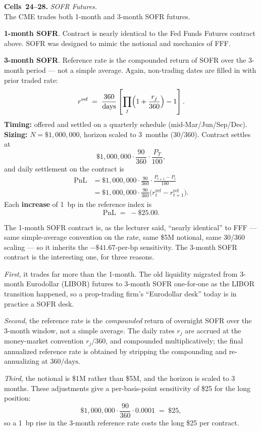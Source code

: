 \begin{keyblock}
\textbf{Cells~24--28.} \emph{SOFR Futures.}\\
The CME trades both 1-month and 3-month SOFR futures.

\textbf{1-month SOFR}. Contract is nearly identical to the Fed Funds
Futures contract above. SOFR was designed to mimic the notional and
mechanics of FFF.

\textbf{3-month SOFR}. Reference rate is the compounded return of SOFR
over the 3-month period --- not a simple average. Again, non-trading dates
are filled in with prior traded rate:
\[
  r^{\text{ref}} \;=\; \frac{360}{\text{days}}
  \left[\prod_j \Bigl(1 + \frac{r_j}{360}\Bigr) - 1\right].
\]
\textbf{Timing:} offered and settled on a quarterly schedule
(mid-Mar/Jun/Sep/Dec). \textbf{Sizing:} $N = \$1{,}000{,}000$, horizon
scaled to 3~months (30/360). Contract settles at
\[
  \$1{,}000{,}000 \cdot \frac{90}{360} \cdot \frac{P_T}{100},
\]
and daily settlement on the contract is
\begin{align*}
  \mathrm{PnL} &= \$1{,}000{,}000 \cdot \frac{90}{360} \cdot \frac{P_{t+1}-P_t}{100} \\
  &= \$1{,}000{,}000 \cdot \frac{90}{360}\bigl(r^{\text{ref}}_t - r^{\text{ref}}_{t+1}\bigr).
\end{align*}
Each \textbf{increase} of 1~bp in the reference index is
\[
  \mathrm{PnL} \;=\; -\$25.00.
\]
\end{keyblock}

The 1-month SOFR contract is, as the lecturer said, ``nearly identical''
to FFF --- same simple-average convention on the rate, same \$5M notional,
same 30/360 scaling --- so it inherits the $-\$41.67$-per-bp sensitivity.
The 3-month SOFR contract is the interesting one, for three reasons.

\emph{First}, it trades far more than the 1-month. The old liquidity
migrated from 3-month Eurodollar (LIBOR) futures to 3-month SOFR one-for-one
as the LIBOR transition happened, so a prop-trading firm's ``Eurodollar
desk'' today is in practice a SOFR desk.

\emph{Second}, the reference rate is the \emph{compounded} return of
overnight SOFR over the 3-month window, not a simple average. The daily
rates $r_j$ are accrued at the money-market convention $r_j / 360$, and
compounded multiplicatively; the final annualized reference rate is
obtained by stripping the compounding and re-annualizing at $360/\text{days}$.

\emph{Third}, the notional is \$1M rather than \$5M, and the horizon is
scaled to 3 months. These adjustments give a per-basis-point sensitivity of
\$25 for the long position:
\[
  \$1{,}000{,}000 \cdot \frac{90}{360} \cdot 0.0001 \;=\; \$25{,}
\]
so a 1~bp rise in the 3-month reference rate costs the long \$25 per
contract.

